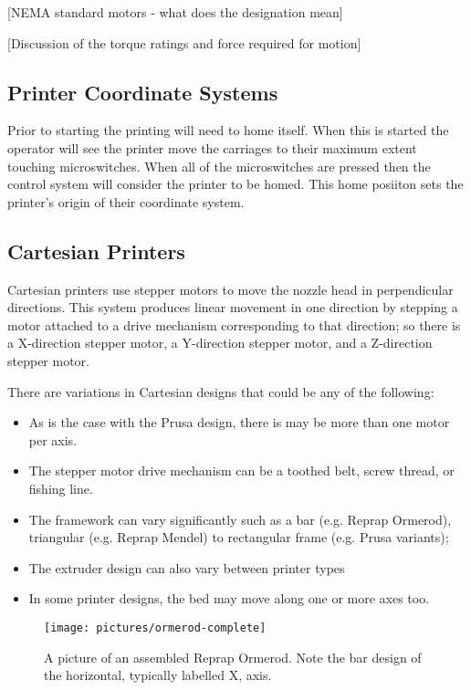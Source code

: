 [NEMA standard motors - what does the designation mean]

[Discussion of the torque ratings and force required for motion]

\subsection{Printer Coordinate Systems}

Prior to starting the printing will need to home itself. When this is started the operator will see the printer move the carriages to their maximum extent touching microswitches. When all of the microswitches are pressed then the control system will consider the printer to be homed. This home posiiton sets the printer's origin of their coordinate system. 

\subsection{Cartesian Printers}

Cartesian printers use stepper motors to move the nozzle head in perpendicular directions. This system produces linear movement in one direction by stepping a motor attached to a drive mechanism corresponding to that direction; so there is a X-direction stepper motor, a Y-direction stepper motor, and a Z-direction stepper motor. 

There are variations in Cartesian designs that could be any of the following: 
\begin{itemize}
	\item As is the case with the Prusa design, there is may be more than one motor per axis. 
	\item The stepper motor drive mechanism can be a toothed belt, screw thread, or fishing line.
	\item The framework can vary significantly such as a bar (e.g. Reprap Ormerod), triangular (e.g. Reprap Mendel) to rectangular frame (e.g. Prusa variants); 
	\item The extruder design can also vary between printer types
	\item In some printer designs, the bed may move along one or more axes too. 
\end{itemize}
    
\begin{figure}
\centering
\texttt{[image: pictures/ormerod-complete]}
\caption{A picture of an assembled Reprap Ormerod. Note the bar design of the horizontal, typically labelled X, axis.}
\label{fig:ormerod-complete}
\end{figure}

